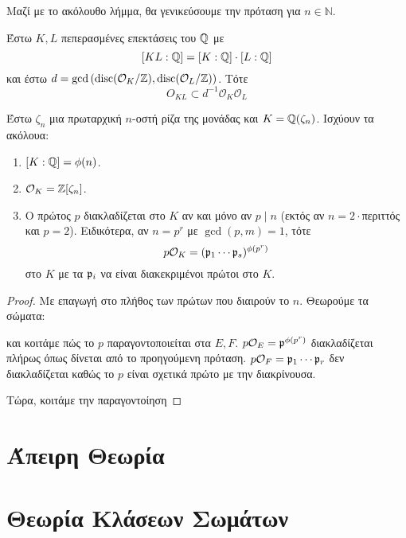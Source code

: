 \documentclass{report}
\begin{document}
Μαζί με το ακόλουθο λήμμα, θα γενικεύσουμε την πρόταση για $n \in \mathbb{N}$.
\begin{lemma}
	Έστω $K,L$ πεπερασμένες επεκτάσεις του $\mathbb{Q}$ με
	$$[KL:\mathbb{Q}] = [K:\mathbb{Q}]\cdot [L:\mathbb{Q}]$$ και έστω $d = \gcd \left( \operatorname{disc}(\mathcal{O}_K/\mathbb{Z}), \operatorname{disc}(\mathcal{O}_L/\mathbb{Z})\right)$. Τότε
	$$O_{KL} \subset d^{-1} \mathcal{O}_K \mathcal{O}_L$$
\end{lemma}

\begin{prop}
	Έστω $\zeta_n$ μια πρωταρχική $n$-οστή ρίζα της μονάδας και $K= \mathbb{Q}(\zeta_n)$. Ισχύουν τα ακόλουα:
	\begin{enumerate}
		\item $[K:\mathbb{Q}] = \phi(n)$.
		\item $\mathcal{O}_K = \mathbb{Z}[\zeta_n]$.
		\item Ο πρώτος $p$ διακλαδίζεται στο $K$ αν και μόνο αν $p\mid n$ (εκτός αν $n=2\cdot$περιττός και $p=2$). Ειδικότερα, αν $n=p^r$ με $\gcd(p,m)=1$, τότε 
		$$p \mathcal{O}_K = (\mathfrak{p}_1 \cdots \mathfrak{p}_s)^{\phi(p^r)}$$ στο $K$ με τα $\mathfrak{p}_i$ να είναι διακεκριμένοι πρώτοι στο $K$. %
	\end{enumerate}
\end{prop}

\begin{proof}

	Με επαγωγή στο πλήθος των πρώτων που διαιρούν το $n$. Θεωρούμε τα σώματα:
	\begin{figure}[H]
		\centering
\end{figure}
και κοιτάμε πώς το $p$ παραγοντοποιείται στα $E,F$.
$p\mathcal{O}_E = \mathfrak{p}^{\phi(p^r)}$ διακλαδίζεται πλήρως όπως δίνεται από το προηγούμενη πρόταση.
$p\mathcal{O}_F = \mathfrak{p}_1\cdots \mathfrak{p}_r$ δεν διακλαδίζεται καθώς το $p$ είναι σχετικά πρώτο με την διακρίνουσα.

Τώρα, κοιτάμε την παραγοντοίηση
\end{proof}

\section{Άπειρη Θεωρία }
\section{Θεωρία Κλάσεων Σωμάτων}
\end{document}
